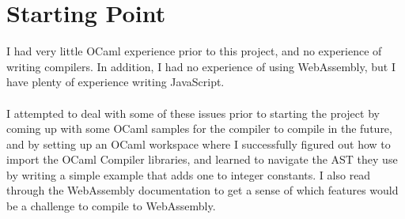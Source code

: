 \section{Starting Point}
I had very little OCaml experience prior to this project, and no experience of writing compilers. In addition, I had no experience of using WebAssembly, but I have plenty of experience writing JavaScript.
\\\\
I attempted to deal with some of these issues prior to starting the project by coming up with some OCaml samples for the compiler to compile in the future, and by setting up an OCaml workspace where I successfully figured out how to import the OCaml Compiler libraries, and learned to navigate the AST they use by writing a simple example that adds one to integer constants. I also read through the WebAssembly documentation to get a sense of which features would be a challenge to compile to WebAssembly.